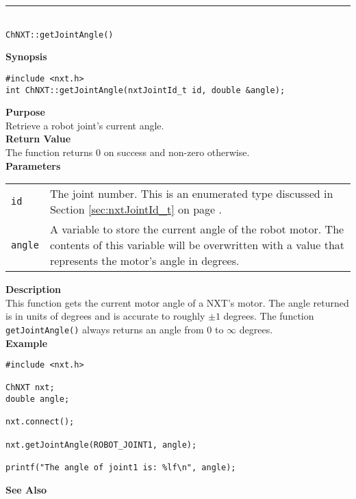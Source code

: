 \noindent
\vspace{5pt}
\rule{4.5in}{0.015in}\\
\noindent
{\LARGE \texttt{ChNXT::getJointAngle()}}\\
{}

\noindent
{\bf Synopsis}
\vspace{-8pt}
\begin{verbatim}
#include <nxt.h>
int ChNXT::getJointAngle(nxtJointId_t id, double &angle);
\end{verbatim}

\noindent
{\bf Purpose}\\
Retrieve a robot joint's current angle.\\

\noindent
{\bf Return Value}\\
The function returns 0 on success and non-zero otherwise.\\

\noindent
{\bf Parameters}\\
\vspace{-0.1in}
\begin{description}
\item               
\begin{tabular}{p{15 mm}p{145 mm}}
\texttt{id} & The joint number. This is an enumerated type 
discussed in Section \ref{sec:nxtJointId_t} on page
\pageref{sec:nxtJointId_t}.\\
\texttt{angle} & A variable to store the current angle of the robot
motor. The contents of this variable will be overwritten with a value that
represents the motor's angle in degrees.  \\
\end{tabular}
\end{description}

\noindent
{\bf Description}\\
This function gets the current motor angle of a NXT's motor. The
angle returned is in units of degrees and is accurate to roughly $\pm1$
degrees. The function \texttt{getJointAngle()} always returns an angle 
from 0 to $\infty$ degrees.\\

\noindent
{\bf Example}\\
\begin{verbatim}
#include <nxt.h>

ChNXT nxt;
double angle;

nxt.connect();

nxt.getJointAngle(ROBOT_JOINT1, angle);

printf("The angle of joint1 is: %lf\n", angle);
\end{verbatim}

\noindent
{\bf See Also}\\

